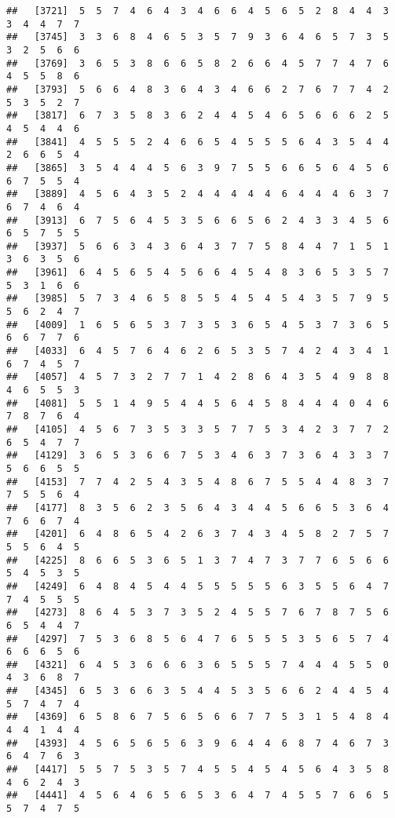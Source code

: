 \documentclass[
]{book}
\begin{document}
\begin{verbatim}
##   [3721]  5  5  7  4  6  4  3  4  6  6  4  5  6  5  2  8  4  4  3  3  4  4  7  7
##   [3745]  3  3  6  8  4  6  5  3  5  7  9  3  6  4  6  5  7  3  5  3  2  5  6  6
##   [3769]  3  6  5  3  8  6  6  5  8  2  6  6  4  5  7  7  4  7  6  4  5  5  8  6
##   [3793]  5  6  6  4  8  3  6  4  3  4  6  6  2  7  6  7  7  4  2  5  3  5  2  7
##   [3817]  6  7  3  5  8  3  6  2  4  4  5  4  6  5  6  6  6  2  5  4  5  4  4  6
##   [3841]  4  5  5  5  2  4  6  6  5  4  5  5  5  6  4  3  5  4  4  2  6  6  5  4
##   [3865]  3  5  4  4  4  5  6  3  9  7  5  5  6  6  5  6  4  5  6  6  7  5  5  4
##   [3889]  4  5  6  4  3  5  2  4  4  4  4  4  6  4  4  4  6  3  7  6  7  4  6  4
##   [3913]  6  7  5  6  4  5  3  5  6  6  5  6  2  4  3  3  4  5  6  6  5  7  5  5
##   [3937]  5  6  6  3  4  3  6  4  3  7  7  5  8  4  4  7  1  5  1  3  6  3  5  6
##   [3961]  6  4  5  6  5  4  5  6  6  4  5  4  8  3  6  5  3  5  7  5  3  1  6  6
##   [3985]  5  7  3  4  6  5  8  5  5  4  5  4  5  4  3  5  7  9  5  5  6  2  4  7
##   [4009]  1  6  5  6  5  3  7  3  5  3  6  5  4  5  3  7  3  6  5  6  6  7  7  6
##   [4033]  6  4  5  7  6  4  6  2  6  5  3  5  7  4  2  4  3  4  1  6  7  4  5  7
##   [4057]  4  5  7  3  2  7  7  1  4  2  8  6  4  3  5  4  9  8  8  4  6  5  5  3
##   [4081]  5  5  1  4  9  5  4  4  5  6  4  5  8  4  4  4  0  4  6  7  8  7  6  4
##   [4105]  4  5  6  7  3  5  3  3  5  7  7  5  3  4  2  3  7  7  2  6  5  4  7  7
##   [4129]  3  6  5  3  6  6  7  5  3  4  6  3  7  3  6  4  3  3  7  5  6  6  5  5
##   [4153]  7  7  4  2  5  4  3  5  4  8  6  7  5  5  4  4  8  3  7  7  5  5  6  4
##   [4177]  8  3  5  6  2  3  5  6  4  3  4  4  5  6  6  5  3  6  4  7  6  6  7  4
##   [4201]  6  4  8  6  5  4  2  6  3  7  4  3  4  5  8  2  7  5  7  5  5  6  4  5
##   [4225]  8  6  6  5  3  6  5  1  3  7  4  7  3  7  7  6  5  6  6  5  4  5  3  5
##   [4249]  6  4  8  4  5  4  4  5  5  5  5  5  6  3  5  5  6  4  7  7  4  5  5  5
##   [4273]  8  6  4  5  3  7  3  5  2  4  5  5  7  6  7  8  7  5  6  6  5  4  4  7
##   [4297]  7  5  3  6  8  5  6  4  7  6  5  5  5  3  5  6  5  7  4  6  6  6  5  6
##   [4321]  6  4  5  3  6  6  6  3  6  5  5  5  7  4  4  4  5  5  0  4  3  6  8  7
##   [4345]  6  5  3  6  6  3  5  4  4  5  3  5  6  6  2  4  4  5  4  5  7  4  7  4
##   [4369]  6  5  8  6  7  5  6  5  6  6  7  7  5  3  1  5  4  8  4  4  4  1  4  4
##   [4393]  4  5  6  5  6  5  6  3  9  6  4  4  6  8  7  4  6  7  3  6  4  7  6  3
##   [4417]  5  5  7  5  3  5  7  4  5  5  4  5  4  5  6  4  3  5  8  4  6  2  4  3
##   [4441]  4  5  6  4  6  5  6  5  3  6  4  7  4  5  5  7  6  6  5  5  7  4  7  5

\end{verbatim}
\end{document}
